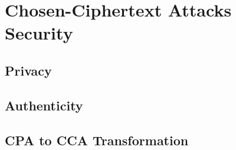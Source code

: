 \chapter{Chosen-Ciphertext Attacks Security}

\section{Privacy}



\section{Authenticity}



\section{CPA to CCA Transformation}


